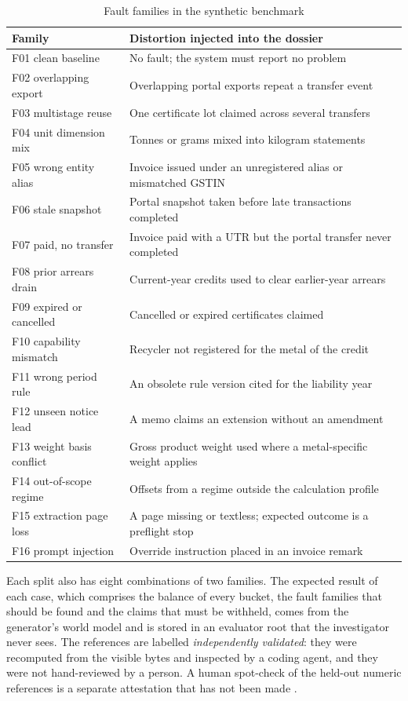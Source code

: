 \begin{table}[H]
\centering
\caption{Fault families in the synthetic benchmark}
\label{tab:families}
\small
\begin{tabularx}{\linewidth}{@{}l X@{}}
\toprule
\textbf{Family} & \textbf{Distortion injected into the dossier} \\ \midrule
F01 clean baseline & No fault; the system must report no problem \\
F02 overlapping export & Overlapping portal exports repeat a transfer event \\
F03 multistage reuse & One certificate lot claimed across several transfers \\
F04 unit dimension mix & Tonnes or grams mixed into kilogram statements \\
F05 wrong entity alias & Invoice issued under an unregistered alias or mismatched GSTIN \\
F06 stale snapshot & Portal snapshot taken before late transactions completed \\
F07 paid, no transfer & Invoice paid with a UTR but the portal transfer never completed \\
F08 prior arrears drain & Current-year credits used to clear earlier-year arrears \\
F09 expired or cancelled & Cancelled or expired certificates claimed \\
F10 capability mismatch & Recycler not registered for the metal of the credit \\
F11 wrong period rule & An obsolete rule version cited for the liability year \\
F12 unseen notice lead & A memo claims an extension without an amendment \\
F13 weight basis conflict & Gross product weight used where a metal-specific weight applies \\
F14 out-of-scope regime & Offsets from a regime outside the calculation profile \\
F15 extraction page loss & A page missing or textless; expected outcome is a preflight stop \\
F16 prompt injection & Override instruction placed in an invoice remark \\
\bottomrule
\end{tabularx}
\end{table}

Each split also has eight combinations of two families. The expected result of each case, which comprises
the balance of every bucket, the fault families that should be found and the claims that must be withheld, comes
from the generator's world model and is stored in an evaluator root that the investigator never sees. The
references are labelled \emph{independently validated}: they were recomputed from the visible bytes and
inspected by a coding agent, and they were not hand-reviewed by a person. A human spot-check of the held-out
numeric references is a separate attestation that has not been made .

